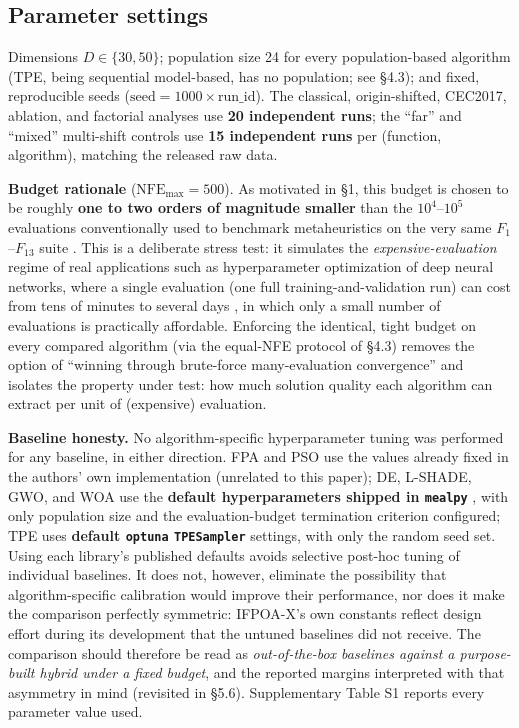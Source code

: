 \documentclass[preprint,12pt]{elsarticle}
\begin{document}
\subsection{Parameter settings}
\label{subsec4-4}

Dimensions $D \in \{30, 50\}$; population size 24 for every population-based algorithm (TPE, being sequential model-based, has no population; see \S4.3); and fixed, reproducible seeds ($\mathrm{seed} = 1000 \times \mathrm{run\_id}$). The classical, origin-shifted, CEC2017, ablation, and factorial analyses use \textbf{20 independent runs}; the ``far'' and ``mixed'' multi-shift controls use \textbf{15 independent runs} per (function, algorithm), matching the released raw data.

\textbf{Budget rationale} ($\mathrm{NFE}_{\max} = 500$). As motivated in \S1, this budget is chosen to be roughly \textbf{one to two orders of magnitude smaller} than the $10^4$--$10^5$ evaluations conventionally used to benchmark metaheuristics on the very same $F_1$--$F_{13}$ suite \cite{yao1999evolutionary}. This is a deliberate stress test: it simulates the \emph{expensive-evaluation} regime of real applications such as hyperparameter optimization of deep neural networks, where a single evaluation (one full training-and-validation run) can cost from tens of minutes to several days \cite{shahriari2016taking,jin2011surrogate}, in which only a small number of evaluations is practically affordable. Enforcing the identical, tight budget on every compared algorithm (via the equal-NFE protocol of \S4.3) removes the option of ``winning through brute-force many-evaluation convergence'' and isolates the property under test: how much solution quality each algorithm can extract per unit of (expensive) evaluation.

\textbf{Baseline honesty.} No algorithm-specific hyperparameter tuning was performed for any baseline, in either direction. FPA and PSO use the values already fixed in the authors' own implementation (unrelated to this paper); DE, L-SHADE, GWO, and WOA use the \textbf{default hyperparameters shipped in \texttt{mealpy}} \cite{vanthieu2023mealpy}, with only population size and the evaluation-budget termination criterion configured; TPE uses \textbf{default \texttt{optuna} \texttt{TPESampler}} \cite{akiba2019optuna} settings, with only the random seed set. Using each library's published defaults avoids selective post-hoc tuning of individual baselines. It does not, however, eliminate the possibility that algorithm-specific calibration would improve their performance, nor does it make the comparison perfectly symmetric: IFPOA-X's own constants reflect design effort during its development that the untuned baselines did not receive. The comparison should therefore be read as \emph{out-of-the-box baselines against a purpose-built hybrid under a fixed budget}, and the reported margins interpreted with that asymmetry in mind (revisited in \S5.6). Supplementary Table S1 reports every parameter value used.
\end{document}
